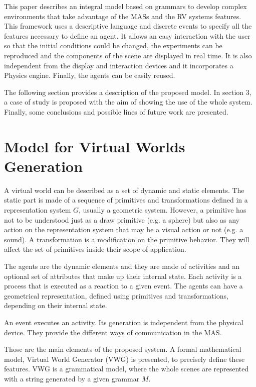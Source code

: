 \documentclass{aamas2012}
\begin{document}
This paper describes an integral model based on grammars to develop complex environments that take
advantage of the MASs and the RV systems features. This framework uses a descriptive language and discrete
events to specify all the features necessary to define an agent. It allows an easy interaction with
the user so that the initial conditions could be changed, the experiments can be reproduced and the
components of the scene are displayed in real time. It is also independent from the display and
interaction devices and it incorporates a Physics engine. Finally, the agents can be easily reused.

The following section provides a description of the proposed model. In section 3, a case of study
is proposed with the aim of showing the use of the whole system. Finally, some conclusions and
possible lines of future work are presented.

\section{Model for Virtual Worlds Generation
\label{sec:model}}

A virtual world can be described as a set of dynamic and static elements. The static part is made of a sequence of primitives and transformations defined in a representation system $G$, usually a geometric system. However, a primitive has not to be understood just as a draw primitive (e.g. a sphere) but also as any action on the representation system that may
be a visual action or not (e.g. a sound). A transformation is a modification on the primitive behavior. They will
affect the set of primitives inside their scope of application.

The agents are the dynamic elements and they are made of activities and an optional set of attributes that make up their internal state. Each activity is a process that is executed as a reaction to a given event. The agents can
have a geometrical representation, defined using primitives and transformations, depending on their
internal state.

An event executes an activity. Its generation is independent from the physical device. They provide
the different ways of communication in the MAS.

Those are the main elements of the proposed system. A formal mathematical model, Virtual World Generator (VWG) is presented, to precisely define these features. VWG is a grammatical model, where the whole scenes are represented with a string generated by a given grammar  $M$.
\end{document}

